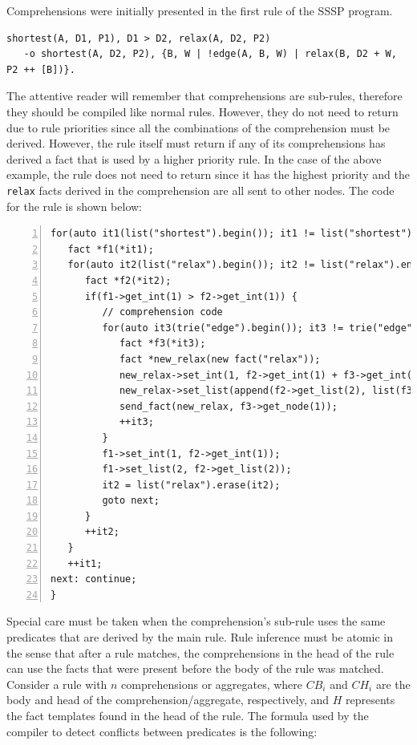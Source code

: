Comprehensions were initially presented in the first rule of the SSSP program.

\begin{Verbatim}[fontsize=\scriptsize]
shortest(A, D1, P1), D1 > D2, relax(A, D2, P2)
   -o shortest(A, D2, P2), {B, W | !edge(A, B, W) | relax(B, D2 + W, P2 ++ [B])}.
\end{Verbatim}

The attentive reader will remember that comprehensions are sub-rules, therefore
they should be compiled like normal rules. However, they do not need to return
due to rule priorities since all the combinations of the comprehension must be
derived. However, the rule itself must return if any of its comprehensions has
derived a fact that is used by a higher priority rule.  In the case of the above
example, the rule does not need to return since it has the highest priority and
the \texttt{relax} facts derived in the comprehension are all sent to other
nodes.  The code for the rule is shown below:

\begin{Verbatim}[numbers=left,fontsize=\scriptsize,xleftmargin=\codemargin]
for(auto it1(list("shortest").begin()); it1 != list("shortest").end(); ) {
   fact *f1(*it1);
   for(auto it2(list("relax").begin()); it2 != list("relax").end(); ) {
      fact *f2(*it2);
      if(f1->get_int(1) > f2->get_int(1)) {
         // comprehension code
         for(auto it3(trie("edge").begin()); it3 != trie("edge").end(); ) {
            fact *f3(*it3);
            fact *new_relax(new fact("relax"));
            new_relax->set_int(1, f2->get_int(1) + f3->get_int(2));
            new_relax->set_list(append(f2->get_list(2), list(f3->get_node(1))));
            send_fact(new_relax, f3->get_node(1));
            ++it3;
         }
         f1->set_int(1, f2->get_int(1));
         f1->set_list(2, f2->get_list(2));
         it2 = list("relax").erase(it2);
         goto next;
      }
      ++it2;
   }
   ++it1;
next: continue;
}
\end{Verbatim}

Special care must be taken when the comprehension's sub-rule uses the same
predicates that are derived by the main rule.
Rule inference must be atomic in the sense that after a rule matches, the
comprehensions in the head of the rule can use the facts that were present
before the body of the rule was matched.
Consider a rule with $n$ comprehensions or aggregates, where $CB_i$ and $CH_i$
are the body and head of the comprehension/aggregate, respectively, and $H$
represents the fact templates found in the head of the rule.
The formula used by the compiler to detect conflicts between predicates is the
following:

